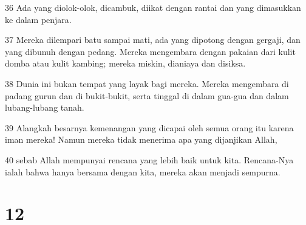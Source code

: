 \par 36 Ada yang diolok-olok, dicambuk, diikat dengan rantai dan yang dimasukkan ke dalam penjara.
\par 37 Mereka dilempari batu sampai mati, ada yang dipotong dengan gergaji, dan yang dibunuh dengan pedang. Mereka mengembara dengan pakaian dari kulit domba atau kulit kambing; mereka miskin, dianiaya dan disiksa.
\par 38 Dunia ini bukan tempat yang layak bagi mereka. Mereka mengembara di padang gurun dan di bukit-bukit, serta tinggal di dalam gua-gua dan dalam lubang-lubang tanah.
\par 39 Alangkah besarnya kemenangan yang dicapai oleh semua orang itu karena iman mereka! Namun mereka tidak menerima apa yang dijanjikan Allah,
\par 40 sebab Allah mempunyai rencana yang lebih baik untuk kita. Rencana-Nya ialah bahwa hanya bersama dengan kita, mereka akan menjadi sempurna.

\chapter{12}


